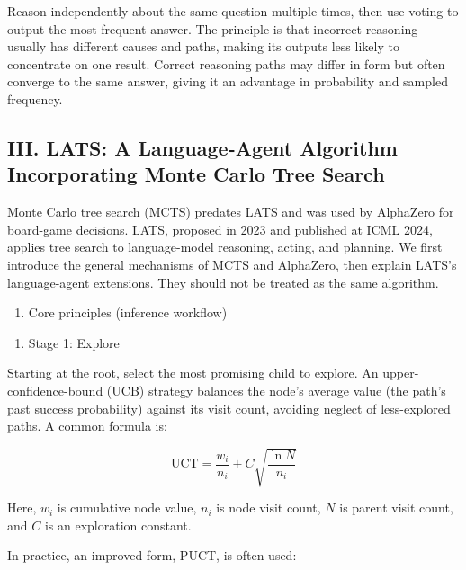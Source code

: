 Reason independently about the same question multiple times, then use voting to output the most frequent answer. The principle is that incorrect reasoning usually has different causes and paths, making its outputs less likely to concentrate on one result. Correct reasoning paths may differ in form but often converge to the same answer, giving it an advantage in probability and sampled frequency.

\hypertarget{iii.-lats-a-language-agent-algorithm-incorporating-monte-carlo-tree-search}{%
\subsection{III. LATS: A Language-Agent Algorithm Incorporating Monte Carlo Tree Search}\label{iii.-lats-a-language-agent-algorithm-incorporating-monte-carlo-tree-search}}

Monte Carlo tree search (MCTS) predates LATS and was used by AlphaZero for board-game decisions. LATS, proposed in 2023 and published at ICML 2024, applies tree search to language-model reasoning, acting, and planning. We first introduce the general mechanisms of MCTS and AlphaZero, then explain LATS's language-agent extensions. They should not be treated as the same algorithm.

\begin{enumerate}
\def\labelenumi{\arabic{enumi}.}
\tightlist
\item
  Core principles (inference workflow)
\end{enumerate}

\begin{enumerate}
\def\labelenumi{(\arabic{enumi})}
\tightlist
\item
  Stage 1: Explore
\end{enumerate}

Starting at the root, select the most promising child to explore. An upper-confidence-bound (UCB) strategy balances the node's average value (the path's past success probability) against its visit count, avoiding neglect of less-explored paths. A common formula is:

\[
\mathrm{UCT}=\frac{w_i}{n_i}+C\sqrt{\frac{\ln N}{n_i}}
\]

Here, \(w_i\) is cumulative node value, \(n_i\) is node visit count, \(N\) is parent visit count, and \(C\) is an exploration constant.

In practice, an improved form, PUCT, is often used:

